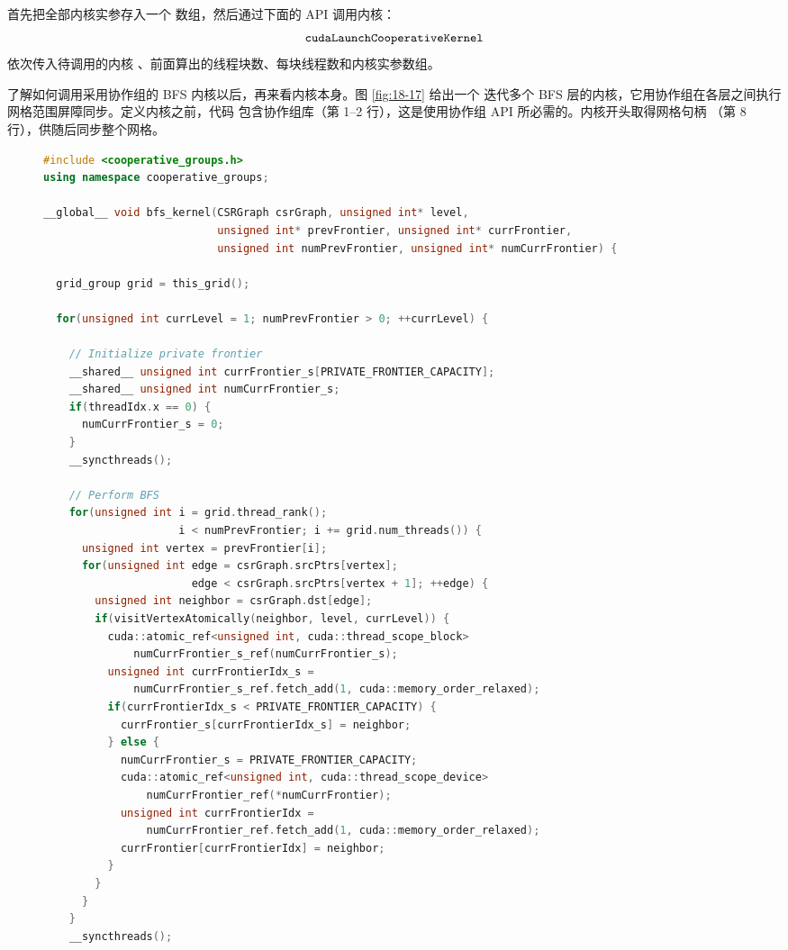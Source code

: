 首先把全部内核实参存入一个  数组，然后通过下面的 API 调用内核：
\[
  \code{cudaLaunchCooperativeKernel}
\]
依次传入待调用的内核
、前面算出的线程块数、每块线程数和内核实参数组。

了解如何调用采用协作组的 BFS 内核以后，再来看内核本身。图 \ref{fig:18-17} 给出一个
迭代多个 BFS 层的内核，它用协作组在各层之间执行网格范围屏障同步。定义内核之前，代码
包含协作组库（第 1--2 行），这是使用协作组 API 所必需的。内核开头取得网格句柄
（第 8 行），供随后同步整个网格。

\begin{figure}[p]
  \centering
  \begin{minipage}{0.99\textwidth}
  \begin{lstlisting}[language=C++,basicstyle=\ttfamily\fontsize{4.8pt}{5.25pt}\selectfont,
    numberstyle=\fontsize{4.2pt}{5.25pt}\selectfont\color{gray},aboveskip=0pt,belowskip=0pt,
    firstnumber=1,lastline=78]
#include <cooperative_groups.h>
using namespace cooperative_groups;

__global__ void bfs_kernel(CSRGraph csrGraph, unsigned int* level,
                           unsigned int* prevFrontier, unsigned int* currFrontier,
                           unsigned int numPrevFrontier, unsigned int* numCurrFrontier) {

  grid_group grid = this_grid();

  for(unsigned int currLevel = 1; numPrevFrontier > 0; ++currLevel) {

    // Initialize private frontier
    __shared__ unsigned int currFrontier_s[PRIVATE_FRONTIER_CAPACITY];
    __shared__ unsigned int numCurrFrontier_s;
    if(threadIdx.x == 0) {
      numCurrFrontier_s = 0;
    }
    __syncthreads();

    // Perform BFS
    for(unsigned int i = grid.thread_rank();
                     i < numPrevFrontier; i += grid.num_threads()) {
      unsigned int vertex = prevFrontier[i];
      for(unsigned int edge = csrGraph.srcPtrs[vertex];
                       edge < csrGraph.srcPtrs[vertex + 1]; ++edge) {
        unsigned int neighbor = csrGraph.dst[edge];
        if(visitVertexAtomically(neighbor, level, currLevel)) {
          cuda::atomic_ref<unsigned int, cuda::thread_scope_block>
              numCurrFrontier_s_ref(numCurrFrontier_s);
          unsigned int currFrontierIdx_s =
              numCurrFrontier_s_ref.fetch_add(1, cuda::memory_order_relaxed);
          if(currFrontierIdx_s < PRIVATE_FRONTIER_CAPACITY) {
            currFrontier_s[currFrontierIdx_s] = neighbor;
          } else {
            numCurrFrontier_s = PRIVATE_FRONTIER_CAPACITY;
            cuda::atomic_ref<unsigned int, cuda::thread_scope_device>
                numCurrFrontier_ref(*numCurrFrontier);
            unsigned int currFrontierIdx =
                numCurrFrontier_ref.fetch_add(1, cuda::memory_order_relaxed);
            currFrontier[currFrontierIdx] = neighbor;
          }
        }
      }
    }
    __syncthreads();


\end{lstlisting}
\end{minipage}
\end{figure}
